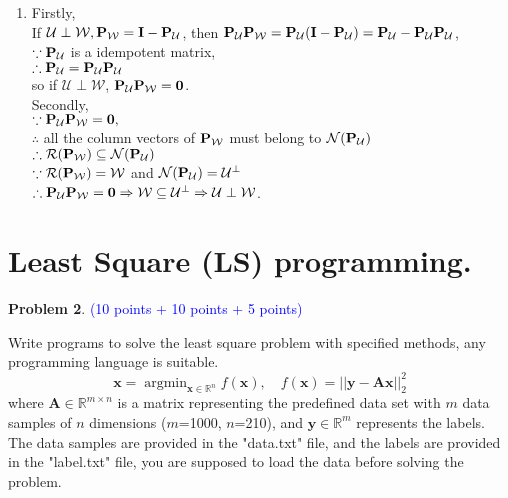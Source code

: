 \documentclass[english,onecolumn]{IEEEtran}
\newcommand{\Rbb}{\mathbb{R}}
\begin{document}
\begin{enumerate}
    \item
    Firstly, \\ 
    If $\mathcal{U} \perp \mathcal{W}, \bf{P_{\mathcal{W}} = I - P_{\mathcal{U}}}$, then $ \bf{P_{\mathcal{U}} P_{\mathcal{W}} = P_{\mathcal{U}} ( I - P_{\mathcal{U}}) = P_{\mathcal{U}} - P_{\mathcal{U}} P_{\mathcal{U}} }$,\\
    $\because \bf{P_{\mathcal{U}}}  $ is a idempotent matrix,\\
    $\therefore \bf{P_{\mathcal{U}} = P_{\mathcal{U}} P_{\mathcal{U}}} $\\
    so if $\mathcal{U} \perp \mathcal{W}$, $\bf{P_{\mathcal{U}} P_{\mathcal{W}}} = 0 $.\\
    Secondly, \\
    $\because \bf{P_{\mathcal{U}} P_{\mathcal{W}}} = 0,  $\\
    $\therefore $ all the column vectors of $\bf{P_{\mathcal{W}} }$ must belong to $\mathcal{N} (\bf{P_{\mathcal{U}
    }})$\\
    $\therefore \mathcal{R} (\bf{P_{\mathcal{W}}}) \subseteq \mathcal{N} (\bf{P_{\mathcal{U}}})$ \\
    $\because \mathcal{R}(\bf{P_{\mathcal{W}}}) = \mathcal{W}$ and $\mathcal{N}(\bf{P_{\mathcal{U}}}) = \mathcal{U}^{\perp}$\\
    $\therefore \bf{P_{\mathcal{U}} P_{\mathcal{W}}} = 0 \Rightarrow \mathcal{W} \subseteq \mathcal{U}^{\perp} \Rightarrow \mathcal{U} \perp \mathcal{W} $.
    
\end{enumerate}

\newpage
\section{Least Square (LS) programming.}
\noindent\textbf{Problem 2}. \textcolor{blue}{(10 points + 10 points + 5 points)}

Write programs to solve the least square problem with specified methods, any programming language is suitable.
$$
\mathbf{x} = \mathop{\arg\min}_{\mathbf{x} \in \Rbb^n} f(\mathbf{x}), \quad f(\mathbf{x}) = ||\mathbf{y}-\mathbf{A}\mathbf{x}||_2^2
$$
where $\mathbf{A} \in \Rbb^{m \times n}$ is a matrix representing the predefined data set with $m$ data samples of $n$ dimensions ($m$=1000, $n$=210), and $\mathbf{y} \in \Rbb^m$ represents the labels. The data samples are provided in the "data.txt" file, and the labels are provided in the "label.txt" file, you are supposed to load the data before solving the problem.
\end{document}
